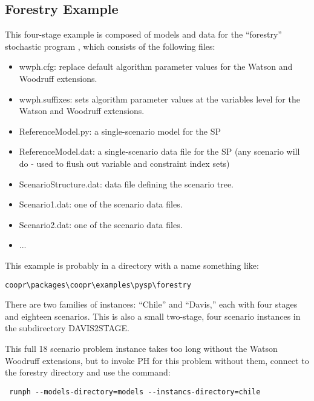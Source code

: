 \subsection{Forestry Example}

This four-stage example is composed of models and data for the ``forestry''
stochastic program \cite{}, which consists of the following files:

\begin{itemize}
  \item wwph.cfg: replace default algorithm parameter values for the Watson and
  Woodruff extensions.

  \item wwph.suffixes: sets algorithm parameter values at the variables level
  for the Watson and Woodruff extensions.

  \item ReferenceModel.py: a single-scenario model for the SP

  \item ReferenceModel.dat: a single-scenario data file for the SP (any scenario
  will do - used to flush out variable and constraint index sets)

  \item ScenarioStructure.dat: data file defining the scenario tree.

  \item Scenario1.dat: one of the scenario data files.

  \item Scenario2.dat: one of the scenario data files.

  \item ...
\end{itemize}

This example is probably in a directory with a name something like:

\begin{verbatim}
coopr\packages\coopr\examples\pysp\forestry
\end{verbatim}

There are two families of instances: ``Chile'' and ``Davis,'' each with four
stages and eighteen scenarios. This is also a small two-stage, four scenario
instances in the subdirectory DAVIS2STAGE.

This full 18 scenario problem instance takes too long without the Watson
Woodruff extensions, but to invoke PH for this problem without them, connect to
the forestry directory and use the command:

\begin{verbatim}
 runph --models-directory=models --instancs-directory=chile
\end{verbatim}


